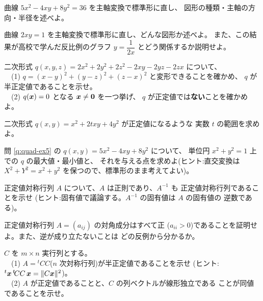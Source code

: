 \begin{mondai}[標準]\label{q:quad-ex5}
曲線 $5x^2 - 4xy + 8y^2 = 36$ を主軸変換で標準形に直し、
図形の種類・主軸の方向・半径を述べよ。
\end{mondai}

\begin{mondai}[標準]\label{q:quad-ex6}
曲線 $2xy = 1$ を主軸変換で標準形に直し、どんな図形か述べよ。
また、この結果が高校で学んだ反比例のグラフ
$y = \dfrac{1}{2x}$ とどう関係するか説明せよ。
\end{mondai}

\begin{mondai}[標準]\label{q:quad-ex7}
二次形式 $q(x, y, z) = 2x^2 + 2y^2 + 2z^2 - 2xy - 2yz - 2zx$ について、\\
　(1) $q = (x - y)^2 + (y - z)^2 + (z - x)^2$ と変形できることを確かめ、
$q$ が半正定値であることを示せ。\\
　(2) $q(\bm{x}) = 0$ となる $\bm{x} \neq \bm{0}$ を一つ挙げ、
$q$ が正定値では\textbf{ない}ことを確かめよ。
\end{mondai}

\begin{mondai}[標準]\label{q:quad-ex8}
二次形式 $q(x, y) = x^2 + 2txy + 4y^2$ が正定値になるような
実数 $t$ の範囲を求めよ。
\end{mondai}

\begin{mondai}[発展]\label{q:quad-ex9}
問 \ref{q:quad-ex5} の $q(x, y) = 5x^2 - 4xy + 8y^2$ について、
単位円 $x^2 + y^2 = 1$ 上での $q$ の最大値・最小値と、
それを与える点を求めよ(ヒント:直交変換は
$X^2 + Y^2 = x^2 + y^2$ を保つので、標準形のまま考えてよい)。
\end{mondai}

\begin{mondai}[発展]\label{q:quad-ex10}
正定値対称行列 $A$ について、$A$ は正則であり、$A^{-1}$ も
正定値対称行列であることを示せ
(ヒント:固有値で議論する。$A^{-1}$ の固有値は $A$ の固有値の
逆数である)。
\end{mondai}

\begin{mondai}[証明]\label{q:quad-ex11}
正定値対称行列 $A = (a_{ij})$ の対角成分はすべて正
($a_{ii} > 0$)であることを証明せよ。また、逆が成り立たないことは
どの反例から分かるか。
\end{mondai}

\begin{mondai}[証明]\label{q:quad-ex12}
$C$ を $m \times n$ 実行列とする。\\
　(1) $A = {}^t\!CC$($n$ 次対称行列)が半正定値であることを示せ
(ヒント:${}^t\bm{x}\,{}^t\!CC\,\bm{x} = \|C\bm{x}\|^2$)。\\
　(2) $A$ が正定値であることと、$C$ の列ベクトルが線形独立である
ことが同値であることを示せ。
\end{mondai}

